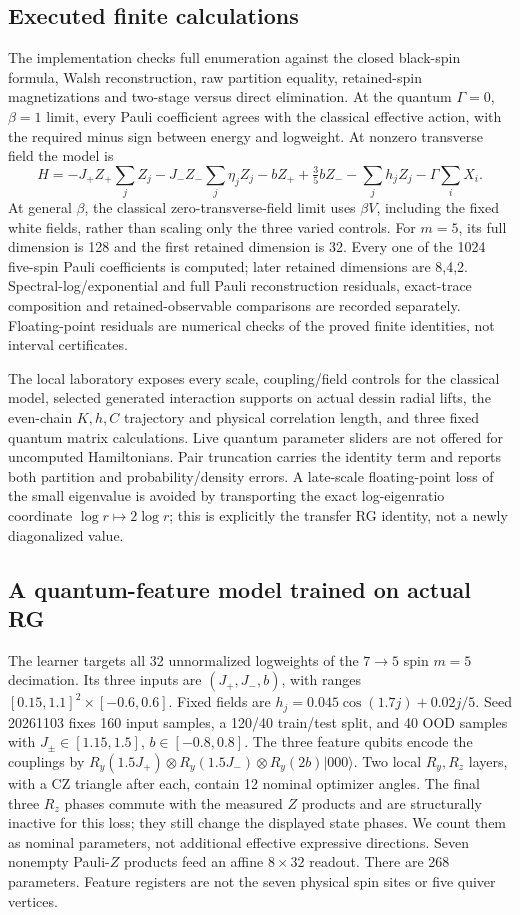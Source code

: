 \documentclass[11pt]{article}
\theoremstyle{definition}\newtheorem{definition}[theorem]{Definition}
\theoremstyle{remark}\newtheorem{remark}[theorem]{Remark}
\begin{document}
\subsection{Executed finite calculations}
The implementation checks full enumeration against the closed black-spin
formula, Walsh reconstruction, raw partition equality, retained-spin
magnetizations and two-stage versus direct elimination. At the quantum
$\Gamma=0$, $\beta=1$ limit, every Pauli coefficient agrees with the
classical effective action, with the required minus sign between energy
and logweight. At nonzero transverse field the model is
\[
 H=-J_+Z_+\sum_jZ_j-J_-Z_-\sum_j\eta_jZ_j-bZ_+
       +\tfrac 35 bZ_--\sum_jh_jZ_j-\Gamma\sum_iX_i.
\]
At general $\beta $, the classical zero-transverse-field limit uses $\beta V $, including the fixed white fields, rather than scaling only the three varied controls.
For $ m=5$, its full dimension is 128 and the first retained dimension is 32.
Every one of the 1024 five-spin Pauli coefficients is computed; later
retained dimensions are 8,4,2. Spectral-log/exponential and full Pauli
reconstruction residuals, exact-trace composition and retained-observable
comparisons are recorded separately. Floating-point residuals are numerical
checks of the proved finite identities, not interval certificates.

The local laboratory exposes every scale, coupling/field controls for the
classical model, selected generated interaction supports on actual dessin
radial lifts, the even-chain $ K,h,C $ trajectory and physical correlation
length, and three fixed quantum matrix calculations. Live quantum parameter
sliders are not offered for uncomputed Hamiltonians. Pair truncation carries
the identity term and reports both partition and probability/density errors.
A late-scale floating-point loss of the small eigenvalue is avoided by
transporting the exact log-eigenratio coordinate $\log r\mapsto 2\log r $;
this is explicitly the transfer RG identity, not a newly diagonalized value.

\subsection{A quantum-feature model trained on actual RG}
The learner targets all 32 unnormalized logweights of the $7\to 5$ spin
$ m=5$ decimation. Its three inputs are $(J_+,J_-,b)$, with ranges
$[0.15,1.1]^2\times[-0.6,0.6]$. Fixed fields are
$ h_j=0.045\cos(1.7 j)+0.02 j/5$. Seed 20261103 fixes 160 input samples, a
120/40 train/test split, and 40 OOD samples with $ J_\pm\in[1.15,1.5]$,
$ b\in[-0.8,0.8]$. The three feature qubits encode the couplings by
$ R_y(1.5 J_+)\otimes R_y(1.5 J_-)\otimes R_y(2 b)|000\rangle $.
Two local $ R_y,R_z $ layers, with a CZ triangle after each, contain 12
nominal optimizer angles. The final three $ R_z $ phases commute with the
measured $ Z $ products and are structurally inactive for this loss; they
still change the displayed state phases. We count them as nominal
parameters, not additional effective expressive directions. Seven nonempty Pauli-$ Z $ products feed an affine
$8\times 32$ readout. There are 268 parameters. Feature registers are not
the seven physical spin sites or five quiver vertices.
\end{document}

